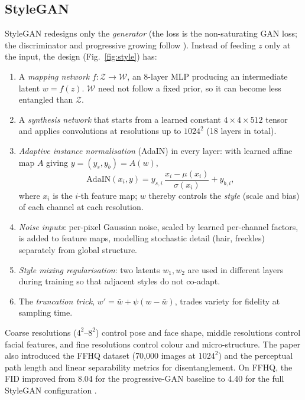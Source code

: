 \documentclass[conference]{IEEEtran}
\theoremstyle{plain}
\theoremstyle{definition}
\begin{document}
\subsection{StyleGAN \cite{karras2019stylegan}}
StyleGAN redesigns only the \emph{generator} (the loss is the non-saturating GAN loss; the discriminator and progressive growing follow \cite{karras2018progan}). Instead of feeding $z$ only at the input, the design (Fig.~\ref{fig:style}) has:
\begin{enumerate}
\item A \emph{mapping network} $f:\mathcal{Z}\to\mathcal{W}$, an 8-layer MLP producing an intermediate latent $w=f(z)$. $\mathcal{W}$ need not follow a fixed prior, so it can become less entangled than $\mathcal{Z}$.
\item A \emph{synthesis network} that starts from a learned constant $4\times4\times512$ tensor and applies convolutions at resolutions up to $1024^2$ (18 layers in total).
\item \emph{Adaptive instance normalisation} (AdaIN) \cite{huang2017adain} in every layer: with learned affine map $A$ giving $y=(y_s,y_b)=A(w)$,
\begin{equation}
\mathrm{AdaIN}(x_i,y)=y_{s,i}\,\frac{x_i-\mu(x_i)}{\sigma(x_i)}+y_{b,i},
\label{eq:adain}
\end{equation}
where $x_i$ is the $i$-th feature map; $w$ thereby controls the \emph{style} (scale and bias) of each channel at each resolution.
\item \emph{Noise inputs}: per-pixel Gaussian noise, scaled by learned per-channel factors, is added to feature maps, modelling stochastic detail (hair, freckles) separately from global structure.
\item \emph{Style mixing regularisation}: two latents $w_1,w_2$ are used in different layers during training so that adjacent styles do not co-adapt.
\item The \emph{truncation trick}, $w'=\bar w+\psi(w-\bar w)$, trades variety for fidelity at sampling time.
\end{enumerate}
Coarse resolutions ($4^2$--$8^2$) control pose and face shape, middle resolutions control facial features, and fine resolutions control colour and micro-structure. The paper also introduced the FFHQ dataset (70,000 images at $1024^2$) and the perceptual path length and linear separability metrics for disentanglement. On FFHQ, the FID improved from 8.04 for the progressive-GAN baseline to 4.40 for the full StyleGAN configuration \cite{karras2019stylegan}.
\end{document}
